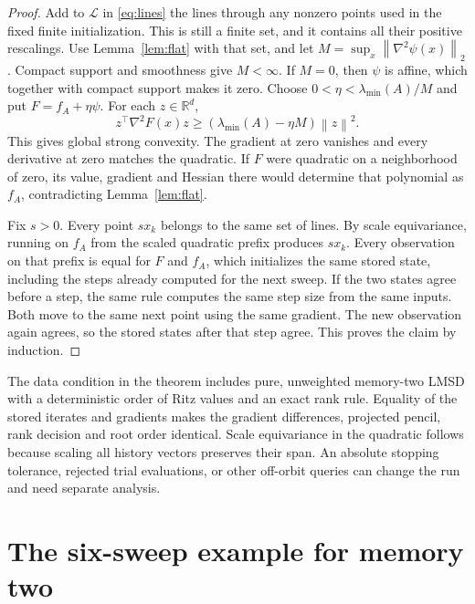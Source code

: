 \documentclass[11pt]{article}
\newcommand{\R}{\mathbb R}
\newcommand{\norm}[1]{\left\lVert#1\right\rVert}
\begin{document}
\begin{proof}
Add to \(\mathcal L\) in \eqref{eq:lines} the lines through any
nonzero points used in the fixed finite initialization. This is
still a finite set, and it contains all their positive rescalings.
Use Lemma~\ref{lem:flat} with that set, and let
\(M=\sup_x\norm{\nabla^2\psi(x)}_2\). Compact support and smoothness
give \(M<\infty\). If \(M=0\), then \(\psi\) is affine, which together
with compact support makes it zero. Choose \(0<\eta<\lambda_{\min}(A)/M\)
and put \(F=f_A+\eta\psi\). For each \(z\in\R^d\),
\[
 z^\top\nabla^2F(x)z
 \ge (\lambda_{\min}(A)-\eta M)\norm{z}^2 .
\]
This gives global strong convexity. The gradient at zero vanishes
and every derivative at zero matches the quadratic. If \(F\) were
quadratic on a neighborhood of zero, its value, gradient and Hessian
there would determine that polynomial as \(f_A\), contradicting
Lemma~\ref{lem:flat}.

Fix \(s>0\). Every point \(sx_k\) belongs to the same set of lines.
By scale equivariance, running on \(f_A\) from the scaled quadratic
prefix produces \(sx_k\). Every observation on that prefix is equal
for \(F\) and \(f_A\), which initializes the same stored state,
including the steps already computed for the next sweep. If the
two states agree before a step, the same rule computes the same
step size from the same inputs. Both move to the same next point
using the same gradient. The new observation again agrees, so the
stored states after that step agree. This proves the claim by
induction.
\end{proof}

The data condition in the theorem includes pure, unweighted
memory-two LMSD with a deterministic order of Ritz values and an
exact rank rule. Equality of the stored iterates and gradients makes
the gradient differences, projected pencil, rank decision and root
order identical. Scale equivariance in the quadratic follows because
scaling all history vectors preserves their span. An absolute
stopping tolerance, rejected trial evaluations, or other off-orbit
queries can change the run and need separate analysis.

\section{The six-sweep example for memory two}
\end{document}
